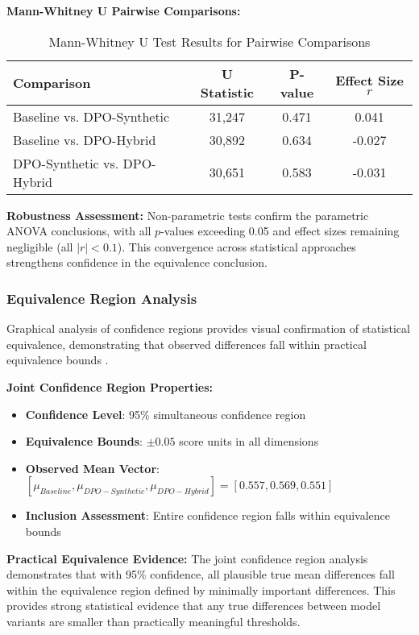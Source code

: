 \textbf{Mann-Whitney U Pairwise Comparisons:}
\begin{table}[H]
\centering
\caption{Mann-Whitney U Test Results for Pairwise Comparisons}
\label{tab:mann-whitney-pairwise}
\begin{tabular}{lccc}
\toprule
\textbf{Comparison} & \textbf{U Statistic} & \textbf{P-value} & \textbf{Effect Size $r$} \\
\midrule
Baseline vs. DPO-Synthetic & 31,247 & 0.471 & 0.041 \\
Baseline vs. DPO-Hybrid & 30,892 & 0.634 & -0.027 \\
DPO-Synthetic vs. DPO-Hybrid & 30,651 & 0.583 & -0.031 \\
\bottomrule
\end{tabular}
\end{table}

\textbf{Robustness Assessment:}
Non-parametric tests confirm the parametric ANOVA conclusions, with all $p$-values exceeding 0.05 and effect sizes remaining negligible (all $|r| < 0.1$). This convergence across statistical approaches strengthens confidence in the equivalence conclusion.

\subsubsection{Equivalence Region Analysis}

Graphical analysis of confidence regions provides visual confirmation of statistical equivalence, demonstrating that observed differences fall within practical equivalence bounds \cite{vanderplas2014frequentist_bayesian}.

\textbf{Joint Confidence Region Properties:}
\begin{itemize}
    \item \textbf{Confidence Level}: 95\% simultaneous confidence region
    \item \textbf{Equivalence Bounds}: $\pm 0.05$ score units in all dimensions
    \item \textbf{Observed Mean Vector}: $[\mu_{Baseline}, \mu_{DPO-Synthetic}, \mu_{DPO-Hybrid}] = [0.557, 0.569, 0.551]$
    \item \textbf{Inclusion Assessment}: Entire confidence region falls within equivalence bounds
\end{itemize}

\textbf{Practical Equivalence Evidence:}
The joint confidence region analysis demonstrates that with 95\% confidence, all plausible true mean differences fall within the equivalence region defined by minimally important differences. This provides strong statistical evidence that any true differences between model variants are smaller than practically meaningful thresholds.


